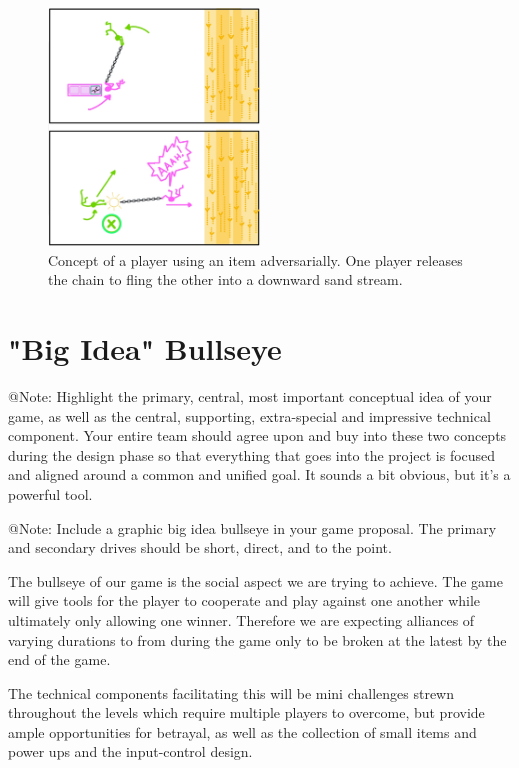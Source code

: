 \begin{figure}[h]
    \centering
    \includegraphics[width=0.5\textwidth]{figures/topmeifyoucan_concept_rope_betrayal.png}
    \caption{Concept of a player using an item adversarially. One player releases the chain to fling the other into a downward sand stream.}
    \label{fig:concept-betrayal}
\end{figure}


\section{"Big Idea" Bullseye}

\begin{TempText}
	@Note: Highlight the primary, central, most important conceptual idea of your game, as well as the central, supporting, extra-special and impressive technical component. Your entire team should agree upon and buy into these two concepts during the design phase so that everything that goes into the project is focused and aligned around a common and unified goal. It sounds a bit obvious, but it's a powerful tool.
\end{TempText}

\begin{TempText}
	@Note: Include a graphic big idea bullseye in your game proposal. The primary and secondary drives should be short, direct, and to the point.
\end{TempText}

The bullseye of our game is the social aspect we are trying to achieve. The game will give tools for the player to cooperate and play against one another while ultimately only allowing one winner. Therefore we are expecting alliances of varying durations to from during the game only to be broken at the latest by the end of the game.
\par
The technical components facilitating this will be mini challenges strewn throughout the levels which require multiple players to overcome, but provide ample opportunities for betrayal, as well as the collection of small items and power ups and the input-control design.

